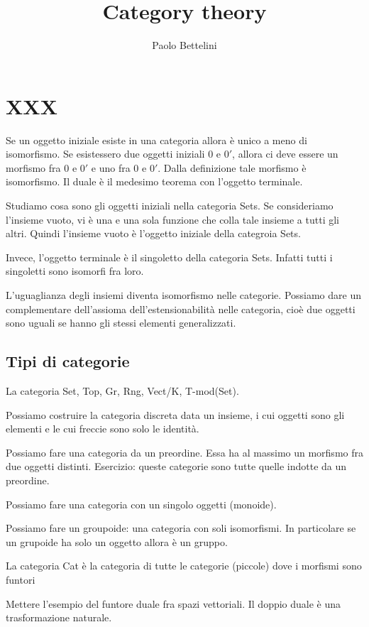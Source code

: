 \documentclass[a4paper]{article}
\title{Category theory}
\author{Paolo Bettelini}
\date{}
\begin{document}
\maketitle
\tableofcontents

\section{XXX}

Se un oggetto iniziale esiste in una categoria allora è unico a meno di isomorfismo.
Se esistessero due oggetti iniziali \(0\) e \(0'\), allora ci deve essere
un morfismo fra \(0\) e \(0'\) e uno fra \(0\) e \(0'\).
Dalla definizione tale morfismo è isomorfismo.
Il duale è il medesimo teorema con l'oggetto terminale.

Studiamo cosa sono gli oggetti iniziali nella categoria Sets.
Se consideriamo l'insieme vuoto, vi è una e una sola funzione che colla tale insieme
a tutti gli altri. Quindi l'insieme vuoto è l'oggetto iniziale della categroia Sets.

Invece, l'oggetto terminale è il singoletto della categoria Sets.
Infatti tutti i singoletti sono isomorfi fra loro.

L'uguaglianza degli insiemi diventa isomorfismo nelle categorie.
Possiamo dare un complementare dell'assioma dell'estensionabilità
nelle categoria, cioè due oggetti sono uguali se hanno gli stessi elementi generalizzati.

\subsection{Tipi di categorie}

La categoria Set, Top, Gr, Rng, Vect/K, T-mod(Set).

Possiamo costruire la categoria discreta data un insieme, i cui oggetti sono gli elementi
e le cui freccie sono solo le identità.

Possiamo fare una categoria da un preordine.
Essa ha al massimo un morfismo fra due oggetti distinti.
Esercizio: queste categorie sono tutte quelle indotte da un preordine.

Possiamo fare una categoria con un singolo oggetti (monoide).

Possiamo fare un groupoide: una categoria con soli isomorfismi.
In particolare se un grupoide ha solo un oggetto allora è un gruppo.

La categoria Cat è la categoria di tutte le categorie (piccole)
dove i morfismi sono funtori

Mettere l'esempio del funtore duale fra spazi vettoriali.
Il doppio duale è una trasformazione naturale.
\end{document}
